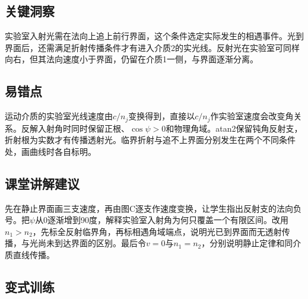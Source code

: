 \documentclass[UTF8,fontset=fandol,a4paper,11pt]{ctexart}
\begin{document}
\subsection*{关键洞察}

实验室入射光需在法向上追上前行界面，这个条件选定实际发生的相遇事件。光到界面后，还需满足折射传播条件才有进入介质2的实光线。反射光在实验室可同样向右，但其法向速度小于界面，仍留在介质1一侧，与界面逐渐分离。



\subsection*{易错点}

运动介质的实验室光线速度由$c/n_j$变换得到，直接以$c/n_j$作实验室速度会改变角关系。反解入射角时同时保留正根、$\cos\psi>0$和物理角域。atan2保留钝角反射支，折射根为实数才有传播透射光。临界折射与追不上界面分别发生在两个不同条件处，画曲线时各自标明。



\subsection*{课堂讲解建议}

先在静止界面画三支速度，再由图C逐支作速度变换，让学生指出反射支的法向负号。把$\psi$从0逐渐增到90度，解释实验室入射角为何只覆盖一个有限区间。改用$n_1>n_2$，先标全反射临界角，再标相遇角域端点，说明光已到界面而无透射传播，与光尚未到达界面的区别。最后令$v=0$与$n_1=n_2$，分别说明静止定律和同介质直线传播。



\subsection*{变式训练}
\end{document}

